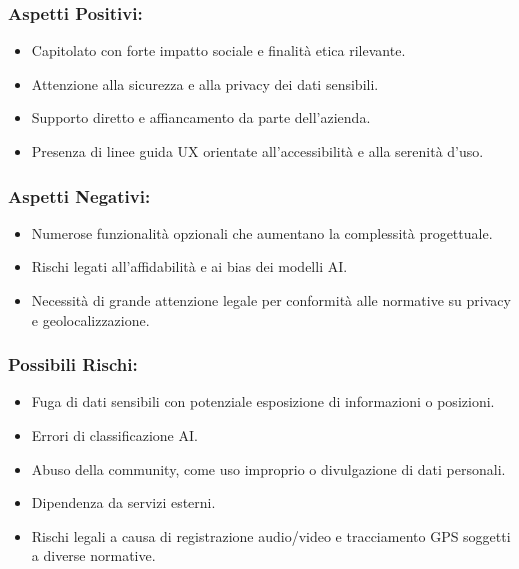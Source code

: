 \documentclass[a4paper,12pt]{article}
\begin{document}
\subsubsection*{Aspetti Positivi:}
\begin{itemize}[leftmargin=*]
    \item Capitolato con forte impatto sociale e finalità etica rilevante.
    \item Attenzione alla sicurezza e alla privacy dei dati sensibili.
    \item Supporto diretto e affiancamento da parte dell’azienda.
    \item Presenza di linee guida UX orientate all’accessibilità e alla serenità d’uso.
\end{itemize}

\subsubsection*{Aspetti Negativi:}
\begin{itemize}[leftmargin=*]
    \item Numerose funzionalità opzionali che aumentano la complessità progettuale.
    \item Rischi legati all’affidabilità e ai bias dei modelli AI.
    \item Necessità di grande attenzione legale per conformità alle normative su privacy e geolocalizzazione.
\end{itemize}

\subsubsection*{Possibili Rischi:}
\begin{itemize}[leftmargin=*]
    \item Fuga di dati sensibili con potenziale esposizione di informazioni o posizioni.
    \item Errori di classificazione AI.
    \item Abuso della community, come uso improprio o divulgazione di dati personali.
    \item Dipendenza da servizi esterni.
    \item Rischi legali a causa di registrazione audio/video e tracciamento GPS soggetti a diverse normative.
\end{itemize}
\end{document}
